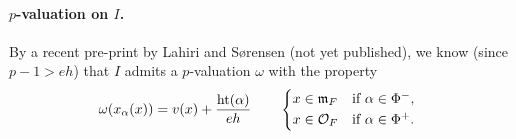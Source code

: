 \paragraph{$p$-valuation on $I$.} By a recent pre-print by Lahiri and Sørensen (not yet published), we know (since $p-1 > eh$) that $I$ admits a $p$-valuation $\omega$ with the property
\begin{equation}\label{eq:Iwa-p-val}
  \omega(x_{\alpha}(x)) = v(x) + \frac{\Ht(\alpha)}{eh} \qquad
  \begin{dcases*}
    x \in \idm_{F} & if $\alpha \in \Phi^{-}$, \\
    x \in \sO_{F} & if $\alpha \in \Phi^{+}$.
  \end{dcases*}
\end{equation}

